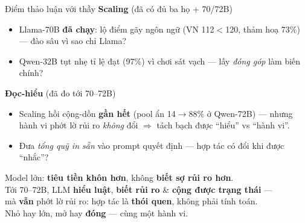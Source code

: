 \documentclass[aspectratio=169,10pt]{beamer}
\newcommand{\good}[1]{\textcolor{green!45!black}{\textbf{#1}}}   %
\begin{document}
\begin{frame}{Điểm thảo luận với thầy}
  \textbf{Scaling} (đã có đủ ba họ + 70/72B)
  \begin{itemize}\setlength\itemsep{2pt}
    \item Llama-70B \good{đã chạy}: lộ điểm gãy \alert{ngôn ngữ} (VN 112$<$120, thảm hoạ 73\%) --- đào sâu vì sao chỉ Llama?
    \item Qwen-32B tụt nhẹ tỉ lệ đạt (97\%) vì chơi sát vạch --- lấy \emph{đóng góp} làm biến chính?
  \end{itemize}
  \smallskip
  \textbf{Đọc-hiểu} (đã đo tới 70--72B)
  \begin{itemize}\setlength\itemsep{2pt}
    \item Scaling hồi cộng-dồn \good{gần hết} (pool ẩn 14$\to$88\% ở Qwen-72B) --- nhưng hành vi phớt lờ rủi ro \emph{không} đổi $\Rightarrow$ tách bạch được ``hiểu'' vs ``hành vi''.
    \item Đưa \emph{tổng quỹ in sẵn} vào prompt quyết định --- hợp tác có đổi khi được ``nhắc''?
  \end{itemize}
\end{frame}

\begin{frame}[standout]
  Model lớn: \textbf{tiêu tiền khôn hơn}, không \textbf{biết sợ rủi ro hơn}. \\[3mm]
  Tới 70--72B, LLM \textbf{hiểu luật}, \textbf{biết rủi ro} \& \textbf{cộng được trạng thái} --- \\
  mà \textbf{vẫn} phớt lờ rủi ro: hợp tác là \textbf{thói quen}, không phải tính toán. \\[3mm]
  {\normalsize Nhỏ hay lớn, mở hay \textbf{đóng} --- cùng một hành vi.}
\end{frame}
\end{document}
